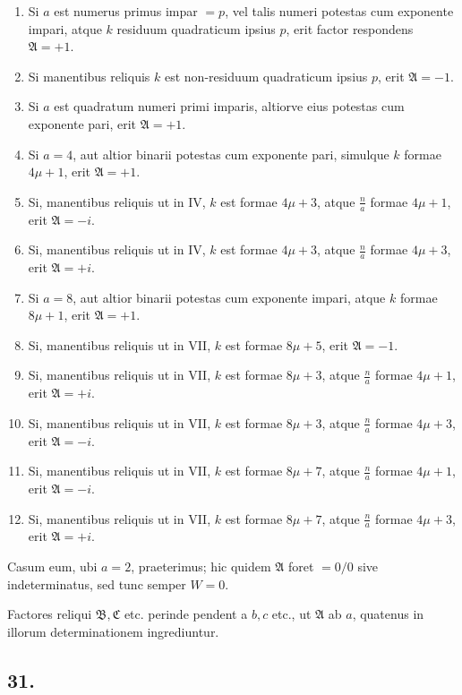\documentclass[12pt]{article}
\begin{document}
\begin{enumerate}[label=\Roman*.,leftmargin=2.5em]
\item Si $a$ est numerus primus impar $=p$, vel talis numeri potestas cum exponente impari, atque $k$ residuum quadraticum ipsius $p$, erit factor respondens $\mathfrak A=+1$.
\item Si manentibus reliquis $k$ est non-residuum quadraticum ipsius $p$, erit $\mathfrak A=-1$.
\item Si $a$ est quadratum numeri primi imparis, altiorve eius potestas cum exponente pari, erit $\mathfrak A=+1$.
\item Si $a=4$, aut altior binarii potestas cum exponente pari, simulque $k$ formae $4\mu+1$, erit $\mathfrak A=+1$.
\item Si, manentibus reliquis ut in IV, $k$ est formae $4\mu+3$, atque $\frac{n}{a}$ formae $4\mu+1$, erit $\mathfrak A=-i$.
\item Si, manentibus reliquis ut in IV, $k$ est formae $4\mu+3$, atque $\frac{n}{a}$ formae $4\mu+3$, erit $\mathfrak A=+i$.
\item Si $a=8$, aut altior binarii potestas cum exponente impari, atque $k$ formae $8\mu+1$, erit $\mathfrak A=+1$.
\item Si, manentibus reliquis ut in VII, $k$ est formae $8\mu+5$, erit $\mathfrak A=-1$.
\item Si, manentibus reliquis ut in VII, $k$ est formae $8\mu+3$, atque $\frac{n}{a}$ formae $4\mu+1$, erit $\mathfrak A=+i$.
\item Si, manentibus reliquis ut in VII, $k$ est formae $8\mu+3$, atque $\frac{n}{a}$ formae $4\mu+3$, erit $\mathfrak A=-i$.
\item Si, manentibus reliquis ut in VII, $k$ est formae $8\mu+7$, atque $\frac{n}{a}$ formae $4\mu+1$, erit $\mathfrak A=-i$.
\item Si, manentibus reliquis ut in VII, $k$ est formae $8\mu+7$, atque $\frac{n}{a}$ formae $4\mu+3$, erit $\mathfrak A=+i$.
\end{enumerate}

Casum eum, ubi $a=2$, praeterimus; hic quidem $\mathfrak A$ foret $=0/0$ sive indeterminatus, sed tunc semper $W=0$.

Factores reliqui $\mathfrak B,\mathfrak C$ etc. perinde pendent a $b,c$ etc., ut $\mathfrak A$ ab $a$, quatenus in illorum determinationem ingrediuntur.

\subsection*{31.}
\end{document}
